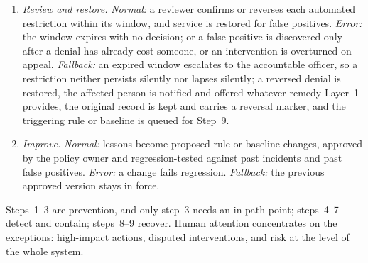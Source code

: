 \documentclass{ieeeaccess}
\begin{document}
\begin{enumerate}
  \textit{Error:} the audit write fails. \textit{Fallback:} the incident stays open and the containment stays in force until the record is complete; no action is reversed on an unrecorded basis.
  \item \textit{Review and restore.} \textit{Normal:} a reviewer confirms or reverses each automated restriction within its window, and service is restored for false positives. \textit{Error:} the window expires with no decision; or a false positive is discovered only after a denial has already cost someone, or an intervention is overturned on appeal. \textit{Fallback:} an expired window escalates to the accountable officer, so a restriction neither persists silently nor lapses silently; a reversed denial is restored, the affected person is notified and offered whatever remedy Layer~1 provides, the original record is kept and carries a reversal marker, and the triggering rule or baseline is queued for Step~9.
  \item \textit{Improve.} \textit{Normal:} lessons become proposed rule or baseline changes, approved by the policy owner and regression-tested against past incidents and past false positives. \textit{Error:} a change fails regression. \textit{Fallback:} the previous approved version stays in force.
\end{enumerate}

Steps~1--3 are prevention, and only step~3 needs an in-path point; steps~4--7 detect and contain; steps~8--9 recover. Human attention concentrates on the exceptions: high-impact actions, disputed interventions, and risk at the level of the whole system.
\end{document}
